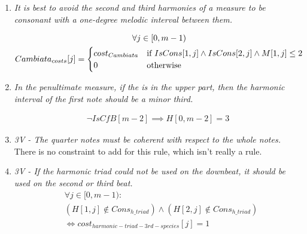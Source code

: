 \begin{enumerate}[wide, label=\bfseries 3.H\arabic*]
\item\label{rule:cambiata} {\textit{It is best to avoid the second and third harmonies of a measure to be consonant with a one-degree melodic interval between them.}}


\begin{equation}
    \begin{gathered}
        \forall j \in [0, m-1)\\
        Cambiata_{costs}[j] = \begin{cases}
            cost_{Cambiata} & \text{if } IsCons[1, j] \land IsCons[2, j] \land M[1, j] \leq 2\\
            0 & \text{otherwise}
        \end{cases}
    \end{gathered}
\end{equation}

\item\label{rule:penult3sp} {\textit{In the penultimate measure, if the \cfs is in the upper part, then the harmonic interval of the first note should be a minor third.}}

\begin{equation}
    \begin{gathered}
        \lnot \mathit{IsCfB}[m-2] \implies H[0, m-2] = 3
    \end{gathered}
\end{equation}

\item \textit{3V - The quarter notes must be coherent with respect to the whole notes.}
There is no constraint to add for this rule, which isn't really a rule.

\item \textit{3V - If the harmonic triad could not be used on the downbeat, it should be used on the second or third beat.}    
    \begin{equation} \begin{aligned}
            &\forall j \in [0, m-1) \colon \\
            &(H[1, j] \notin Cons_{h\_triad}) \land  (H[2, j] \notin Cons_{h\_triad})\\
            &\iff cost_{harmonic-triad-3rd-species}[j] = 1       
    \end{aligned} \end{equation}
\end{enumerate}



